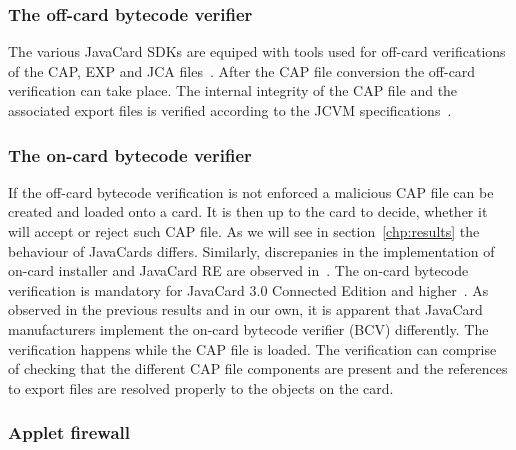 \documentclass{../llncs/llncs}
\begin{document}
    \subsubsection{The off-card bytecode verifier}

The various JavaCard SDKs are equiped with tools used for off-card verifications of the CAP, EXP and JCA files~\cite{jcoffcardverifier}. After the CAP file conversion the off-card verification can take place. The internal integrity of the CAP file and the associated export files is verified according to the JCVM specifications~\cite{jcspecs31download}.

    \subsubsection{The on-card bytecode verifier}

    If the off-card bytecode verification is not enforced a malicious CAP file can be created and loaded onto a card. It is then up to the card to decide, whether it will accept or reject such CAP file. As we will see in section~\ref{chp:results} the behaviour of JavaCards differs. Similarly, discrepanies in the implementation of on-card installer and JavaCard RE are observed in~\cite{lanettrojan}. The on-card bytecode verification is mandatory for JavaCard 3.0 Connected Edition and higher~\cite{barbusecond}. As observed in the previous results and in our own, it is apparent that JavaCard manufacturers implement the on-card bytecode verifier (BCV) differently. The verification happens while the CAP file is loaded. The verification can comprise of checking that the different CAP file components are present and the references to export files are resolved properly to the objects on the card.


    \subsubsection{Applet firewall}
\end{document}
